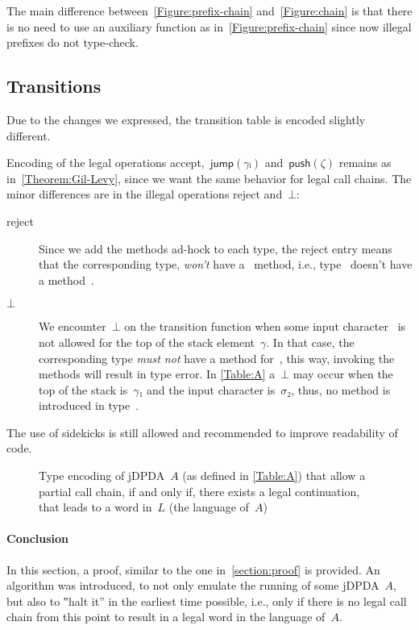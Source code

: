 The main difference between~\cref{Figure:prefix-chain} and~\cref{Figure:chain} is that there is no need to
  use an auxiliary function  as in~\cref{Figure:prefix-chain} since now illegal
  prefixes do not type-check.

\subsection{Transitions}
Due to the changes we expressed, the transition table is encoded slightly different.

Encoding of the legal operations \textsf{accept},~$\textsf{jump}(γᵢ)$ and~$\textsf{push}(ζ)$
  remains as in~\cref{Theorem:Gil-Levy}, since we want the same behavior for legal call chains.
The minor differences are in the illegal operations \textsf{reject} and~$⊥$:

\begin{description}
 \item[\textsf{reject}] Since we add the methods ad-hock to each type, the reject entry means
   that the corresponding type, \emph{won't} have a~\cc{\$()} method, i.e., type~
   doesn't have a method~\cc{\$()}.
 \item[$⊥$] We encounter~$⊥$ on the transition function when some input character~
   is not allowed for the top of the stack element~$γ$. In that case, the corresponding type 
   \emph{must not} have a method for~, this way, invoking the methods will result in type error.
   In \cref{Table:A} a~$⊥$ may occur when the top of the stack is~$γ₁$ and the input character is~$σ₂$,
   thus, no method  is introduced in type~.
\end{description}

The use of sidekicks is still allowed and recommended to improve readability of code.

\begin{figure}[ht]
  \caption{\label{Figure:prefix-A}Type encoding of jDPDA~$A$ (as defined in \cref{Table:A})
    that allow a partial call chain, if and only if, there exists a legal continuation, that
    leads to a word in~$L$ (the language of~$A$)}
\end{figure}

\paragraph*{Conclusion}
In this section, a proof, similar to the one in~\cref{section:proof} is provided.
An algorithm was introduced, to not only emulate the running of some jDPDA~$A$,
  but also to ‟halt it” in the earliest time possible, i.e., only if there is
  no legal call chain from this point to result in a legal word in the language of~$A$.
